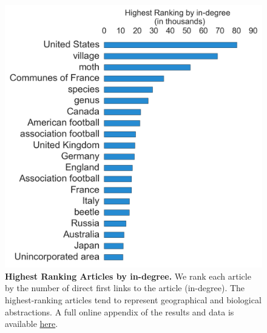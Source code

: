 \documentclass[pre,twocolumn,twoside,superscriptaddress,floatfix, aps, 10pt]{revtex4-1}
\begin{document}
\begin{figure}[tp!]
  \includegraphics[width=\columnwidth]{graphics/articles_ndegree.png}
  \caption{
    \textbf{Highest Ranking Articles by in-degree.}
    We rank each article by the number of direct first links to the article (in-degree). The highest-ranking articles tend to represent geographical and biological abstractions. A full online appendix of the results and data is available \href{http://compstorylab.org/share/papers/ibrahim2016a/index.html}{here}.}
  \label{fig:indegree list}
\end{figure}
\end{document}

